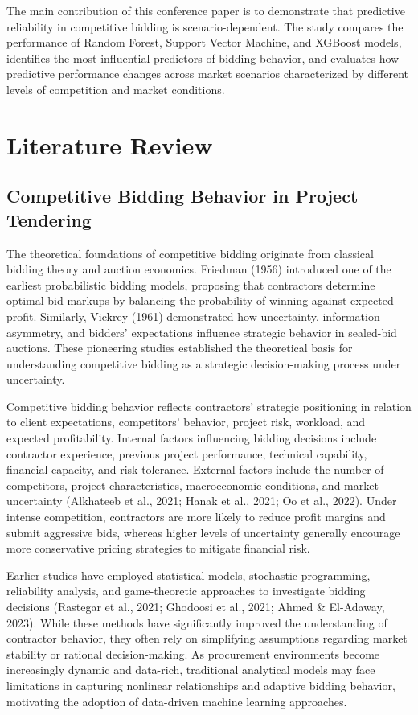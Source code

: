 \documentclass[twoside]{article}
\begin{document}
The main contribution of this conference paper is to demonstrate that predictive reliability in competitive bidding is scenario-dependent. The study compares the performance of Random Forest, Support Vector Machine, and XGBoost models, identifies the most influential predictors of bidding behavior, and evaluates how predictive performance changes across market scenarios characterized by different levels of competition and market conditions.

\section{Literature Review}

\subsection{Competitive Bidding Behavior in Project Tendering}

The theoretical foundations of competitive bidding originate from classical bidding theory and auction economics. Friedman (1956) introduced one of the earliest probabilistic bidding models, proposing that contractors determine optimal bid markups by balancing the probability of winning against expected profit. Similarly, Vickrey (1961) demonstrated how uncertainty, information asymmetry, and bidders' expectations influence strategic behavior in sealed-bid auctions. These pioneering studies established the theoretical basis for understanding competitive bidding as a strategic decision-making process under uncertainty.

Competitive bidding behavior reflects contractors' strategic positioning in relation to client expectations, competitors' behavior, project risk, workload, and expected profitability. Internal factors influencing bidding decisions include contractor experience, previous project performance, technical capability, financial capacity, and risk tolerance. External factors include the number of competitors, project characteristics, macroeconomic conditions, and market uncertainty (Alkhateeb et al., 2021; Hanak et al., 2021; Oo et al., 2022). Under intense competition, contractors are more likely to reduce profit margins and submit aggressive bids, whereas higher levels of uncertainty generally encourage more conservative pricing strategies to mitigate financial risk.

Earlier studies have employed statistical models, stochastic programming, reliability analysis, and game-theoretic approaches to investigate bidding decisions (Rastegar et al., 2021; Ghodoosi et al., 2021; Ahmed \& El-Adaway, 2023). While these methods have significantly improved the understanding of contractor behavior, they often rely on simplifying assumptions regarding market stability or rational decision-making. As procurement environments become increasingly dynamic and data-rich, traditional analytical models may face limitations in capturing nonlinear relationships and adaptive bidding behavior, motivating the adoption of data-driven machine learning approaches.
\end{document}
